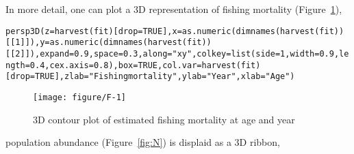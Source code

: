 \documentclass[a4paper,english,10pt]{article}\usepackage[]{graphicx}\usepackage[]{color}
\makeatletter
\def\maxwidth{ %
  \ifdim\Gin@nat@width>\linewidth
    \linewidth
  \else
    \Gin@nat@width
  \fi
}
\newcommand{\hlnum}[1]{\textcolor[rgb]{0.2,0.2,0.2}{#1}}%
\newcommand{\hlstr}[1]{\textcolor[rgb]{0.2,0.2,0.2}{#1}}%
\newcommand{\hlstd}[1]{\textcolor[rgb]{0,0,0}{#1}}%
\newcommand{\hlkwc}[1]{\textcolor[rgb]{0.361,0.506,0.596}{#1}}%
\newcommand{\hlkwd}[1]{\textcolor[rgb]{0.361,0.506,0.596}{#1}}%
\newenvironment{kframe}{%
 \def\at@end@of@kframe{}%
 \ifinner\ifhmode%
  \def\at@end@of@kframe{\end{minipage}}%
  \begin{minipage}{\columnwidth}%
 \fi\fi%
 \def\FrameCommand##1{\hskip\@totalleftmargin \hskip-\fboxsep
 \colorbox{shadecolor}{##1}\hskip-\fboxsep
     \hskip-\linewidth \hskip-\@totalleftmargin \hskip\columnwidth}%
 \MakeFramed {\advance\hsize-\width
   \@totalleftmargin\z@ \linewidth\hsize
   \@setminipage}}%
 {\par\unskip\endMakeFramed%
 \at@end@of@kframe}
\newenvironment{knitrout}{}{} %
\makeatother
\begin{document}
In more detail, one can plot a 3D representation of fishing mortality (Figure~\ref{fig:F}),

\begin{knitrout}
\color{fgcolor}\begin{kframe}
\begin{alltt}
\hlkwd{persp3D}\hlstd{(}\hlkwc{z}\hlstd{=}\hlkwd{harvest}\hlstd{(fit)[}\hlkwc{drop}\hlstd{=}\hlnum{TRUE}\hlstd{],} \hlkwc{x}\hlstd{=}\hlkwd{as.numeric}\hlstd{(}\hlkwd{dimnames}\hlstd{(}\hlkwd{harvest}\hlstd{(fit))[[}\hlnum{1}\hlstd{]]),} \hlkwc{y}\hlstd{=}\hlkwd{as.numeric}\hlstd{(}\hlkwd{dimnames}\hlstd{(}\hlkwd{harvest}\hlstd{(fit))[[}\hlnum{2}\hlstd{]]),} \hlkwc{expand} \hlstd{=} \hlnum{0.9}\hlstd{,} \hlkwc{space} \hlstd{=} \hlnum{0.3}\hlstd{,} \hlkwc{along} \hlstd{=} \hlstr{"xy"}\hlstd{,} \hlkwc{colkey} \hlstd{=} \hlkwd{list}\hlstd{(}\hlkwc{side}\hlstd{=}\hlnum{1}\hlstd{,} \hlkwc{width} \hlstd{=} \hlnum{0.9}\hlstd{,} \hlkwc{length} \hlstd{=} \hlnum{0.4}\hlstd{,} \hlkwc{cex.axis} \hlstd{=} \hlnum{0.8}\hlstd{),} \hlkwc{box} \hlstd{=} \hlnum{TRUE}\hlstd{,} \hlkwc{col.var}\hlstd{=}\hlkwd{harvest}\hlstd{(fit)[}\hlkwc{drop}\hlstd{=}\hlnum{TRUE}\hlstd{],} \hlkwc{zlab}\hlstd{=}\hlstr{"Fishing mortality"}\hlstd{,} \hlkwc{ylab}\hlstd{=}\hlstr{"Year"}\hlstd{,} \hlkwc{xlab}\hlstd{=}\hlstr{"Age"}\hlstd{)}
\end{alltt}
\end{kframe}\begin{figure}[H]

{\centering \texttt{[image: figure/F-1]} 

}

\caption[3D contour plot of estimated fishing mortality at age and year]{3D contour plot of estimated fishing mortality at age and year\label{fig:F}}
\end{figure}


\end{knitrout}

population abundance (Figure~\ref{fig:N}) is displaid as a 3D ribbon, 
\end{document}
